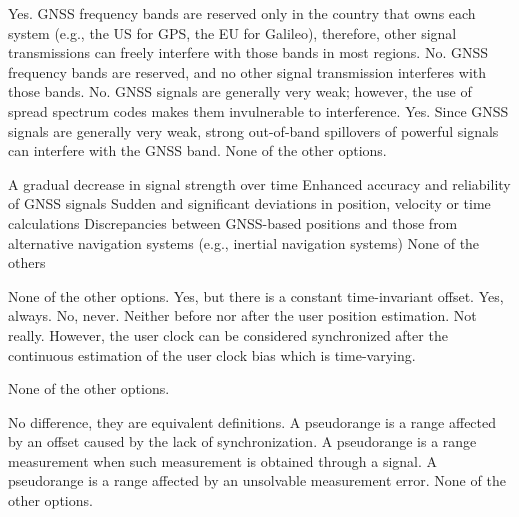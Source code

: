 \begin{checkboxes}
    \choice Yes. GNSS frequency bands are reserved only in the country that owns each system (e.g., the US for GPS, the EU for Galileo), therefore, other signal transmissions can freely interfere with those bands in most regions.
    \choice No. GNSS frequency bands are reserved, and no other signal transmission interferes with those bands.
    \choice No. GNSS signals are generally very weak; however, the use of spread spectrum codes makes them invulnerable to interference.
    \CorrectChoice Yes. Since GNSS signals are generally very weak, strong out-of-band spillovers of powerful signals can interfere with the GNSS band.
    \choice None of the other options.
\end{checkboxes}

\begin{checkboxes}
    \choice A gradual decrease in signal strength over time
    \choice Enhanced accuracy and reliability of GNSS signals
    \CorrectChoice Sudden and significant deviations in position, velocity or time calculations
    \CorrectChoice Discrepancies between GNSS-based positions and those from alternative navigation systems (e.g., inertial navigation systems)
    \choice None of the others
\end{checkboxes}


\begin{checkboxes}
    \choice None of the other options.
    \choice Yes, but there is a constant time-invariant offset.
    \choice Yes, always.
    \choice No, never. Neither before nor after the user position estimation.
    \CorrectChoice Not really. However, the user clock can be considered synchronized after the
    continuous estimation of the user clock bias which is time-varying.
\end{checkboxes}

\begin{checkboxes}
    \choice None of the other options.
\end{checkboxes}


\begin{checkboxes}
    \choice No difference, they are equivalent definitions.
    \CorrectChoice A pseudorange is a range affected by an offset caused by the lack of synchronization.
    \choice A pseudorange is a range measurement when such measurement is obtained through a signal.
    \choice A pseudorange is a range affected by an unsolvable measurement error.
    \choice None of the other options.
\end{checkboxes}

